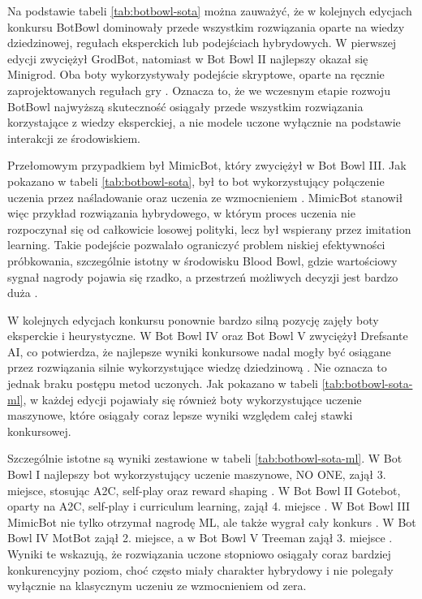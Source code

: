 Na podstawie tabeli \ref{tab:botbowl-sota} można zauważyć, że w kolejnych edycjach konkursu BotBowl dominowały przede wszystkim rozwiązania oparte na wiedzy dziedzinowej, regułach eksperckich lub podejściach hybrydowych. W pierwszej edycji zwyciężył GrodBot, natomiast w Bot Bowl II najlepszy okazał się Minigrod. Oba boty wykorzystywały podejście skryptowe, oparte na ręcznie zaprojektowanych regułach gry \cite{BotBowlI,BotBowlII}. Oznacza to, że we wczesnym etapie rozwoju BotBowl najwyższą skuteczność osiągały przede wszystkim rozwiązania korzystające z wiedzy eksperckiej, a nie modele uczone wyłącznie na podstawie interakcji ze środowiskiem.

Przełomowym przypadkiem był MimicBot, który zwyciężył w Bot Bowl III. Jak pokazano w tabeli \ref{tab:botbowl-sota}, był to bot wykorzystujący połączenie uczenia przez naśladowanie oraz uczenia ze wzmocnieniem \cite{BotBowlIII,PezzottiMimicBot}. MimicBot stanowił więc przykład rozwiązania hybrydowego, w którym proces uczenia nie rozpoczynał się od całkowicie losowej polityki, lecz był wspierany przez imitation learning. Takie podejście pozwalało ograniczyć problem niskiej efektywności próbkowania, szczególnie istotny w środowisku Blood Bowl, gdzie wartościowy sygnał nagrody pojawia się rzadko, a przestrzeń możliwych decyzji jest bardzo duża \cite{PezzottiMimicBot}.

W kolejnych edycjach konkursu ponownie bardzo silną pozycję zajęły boty eksperckie i heurystyczne. W Bot Bowl IV oraz Bot Bowl V zwyciężył Drefsante AI, co potwierdza, że najlepsze wyniki konkursowe nadal mogły być osiągane przez rozwiązania silnie wykorzystujące wiedzę dziedzinową \cite{BotBowlIV,BotBowlV}. Nie oznacza to jednak braku postępu metod uczonych. Jak pokazano w tabeli \ref{tab:botbowl-sota-ml}, w każdej edycji pojawiały się również boty wykorzystujące uczenie maszynowe, które osiągały coraz lepsze wyniki względem całej stawki konkursowej.

Szczególnie istotne są wyniki zestawione w tabeli \ref{tab:botbowl-sota-ml}. W Bot Bowl I najlepszy bot wykorzystujący uczenie maszynowe, NO ONE, zajął 3. miejsce, stosując A2C, self-play oraz reward shaping \cite{BotBowlI}. W Bot Bowl II Gotebot, oparty na A2C, self-play i curriculum learning, zajął 4. miejsce \cite{BotBowlII}. W Bot Bowl III MimicBot nie tylko otrzymał nagrodę ML, ale także wygrał cały konkurs \cite{BotBowlIII,PezzottiMimicBot}. W Bot Bowl IV MotBot zajął 2. miejsce, a w Bot Bowl V Treeman zajął 3. miejsce \cite{BotBowlIV,BotBowlV}. Wyniki te wskazują, że rozwiązania uczone stopniowo osiągały coraz bardziej konkurencyjny poziom, choć często miały charakter hybrydowy i nie polegały wyłącznie na klasycznym uczeniu ze wzmocnieniem od zera.

